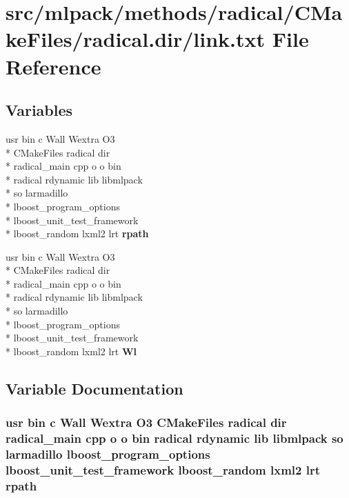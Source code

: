 \section{src/mlpack/methods/radical/\-C\-Make\-Files/radical.dir/link.txt File Reference}
\label{methods_2radical_2CMakeFiles_2radical_8dir_2link_8txt}
\subsection*{Variables}
\begin{DoxyCompactItemize}
\item 
usr bin c Wall Wextra O3 \\*
C\-Make\-Files radical dir \\*
radical\-\_\-main cpp o o bin \\*
radical rdynamic lib libmlpack \\*
so larmadillo \\*
lboost\-\_\-program\-\_\-options \\*
lboost\-\_\-unit\-\_\-test\-\_\-framework \\*
lboost\-\_\-random lxml2 lrt {\bf rpath}
\item 
usr bin c Wall Wextra O3 \\*
C\-Make\-Files radical dir \\*
radical\-\_\-main cpp o o bin \\*
radical rdynamic lib libmlpack \\*
so larmadillo \\*
lboost\-\_\-program\-\_\-options \\*
lboost\-\_\-unit\-\_\-test\-\_\-framework \\*
lboost\-\_\-random lxml2 lrt {\bf Wl}
\end{DoxyCompactItemize}


\subsection{Variable Documentation}
\subsubsection[{rpath}]{\setlength{\rightskip}{0pt plus 5cm}usr bin c Wall Wextra O3 C\-Make\-Files radical dir radical\-\_\-main cpp o o bin radical rdynamic lib libmlpack so larmadillo lboost\-\_\-program\-\_\-options lboost\-\_\-unit\-\_\-test\-\_\-framework lboost\-\_\-random lxml2 lrt rpath}\label{methods_2radical_2CMakeFiles_2radical_8dir_2link_8txt_a5abecdbf35fa18469cee40c64ed1c9de}



